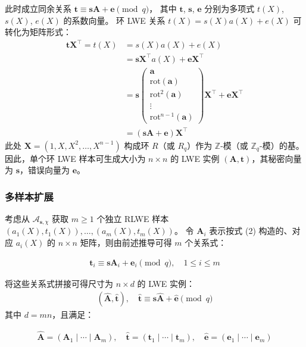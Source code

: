 \documentclass[12pt,a4paper]{article}
\numberwithin{equation}{section}
\begin{document}
此时成立同余关系 $\mathbf{t} \equiv \mathbf{s}\mathbf{A} + \mathbf{e} \pmod{q}$，
其中 $\mathbf{t}$, $\mathbf{s}$, $\mathbf{e}$ 分别为多项式 $t(X)$, $s(X)$, $e(X)$ 的系数向量。
环 LWE 关系 $t(X) = s(X)a(X) + e(X)$ 可转化为矩阵形式：
\begin{align}
    \mathbf{t}\mathbf{X}^\top = t(X) &= s(X)a(X) + e(X) \\
    &= \mathbf{s}\mathbf{X}^\top a(X) + \mathbf{e}\mathbf{X}^\top \\
    &= \mathbf{s} \begin{pmatrix}
        \mathbf{a} \\
        \mathrm{rot}(\mathbf{a}) \\
        \mathrm{rot}^2(\mathbf{a}) \\
        \vdots \\
        \mathrm{rot}^{n-1}(\mathbf{a})
    \end{pmatrix} \mathbf{X}^\top + \mathbf{e}\mathbf{X}^\top \\
    & = (\mathbf{s}\mathbf{A} + \mathbf{e})\mathbf{X}^\top
\end{align}
此处 $\mathbf{X} = (1, X, X^2, \ldots , X^{n-1})$ 构成环 $R$（或 $R_q$）作为 $\mathbb{Z}$-模（或 $\mathbb{Z}_q$-模）的基。
因此，单个环 LWE 样本可生成大小为 $n \times n$ 的 LWE 实例 $(\mathbf{A}, \mathbf{t})$，其秘密向量为 $\mathbf{s}$，错误向量为 $\mathbf{e}$。

\subsubsection{多样本扩展}
考虑从 $\mathcal{A}_{\mathbf{s},\chi}$ 获取 $m \geq 1$ 个独立 RLWE 样本 $(a_1(X), t_1(X)), \ldots, (a_m(X), t_m(X))$。
令 $\mathbf{A}_i$ 表示按式 (2) 构造的、对应 $a_i(X)$ 的 $n \times n$ 矩阵，则由前述推导可得 $m$ 个关系式：

\begin{align}
\mathbf{t}_i \equiv \mathbf{s}\mathbf{A}_i + \mathbf{e}_i \pmod{q}, \quad 1 \leq i \leq m
\end{align}

将这些关系式拼接可得尺寸为 $n \times d$ 的 LWE 实例：
\begin{align}
    (\mathbf{\hat{A}},\mathbf{\hat{t}}), \quad \mathbf{\hat{t}} \equiv \mathbf{s}\mathbf{\hat{A}} + \mathbf{\hat{e}} \pmod{q}
\end{align}
其中 $d = mn$，且满足：

\begin{align}
\mathbf{\hat{A}} = (\mathbf{A}_1 \mid \cdots \mid \mathbf{A}_m), \quad 
\mathbf{\hat{t}} = (\mathbf{t}_1 \mid \cdots \mid \mathbf{t}_m), \quad 
\mathbf{\hat{e}} = (\mathbf{e}_1 \mid \cdots \mid \mathbf{e}_m)
\end{align}
\end{document}
